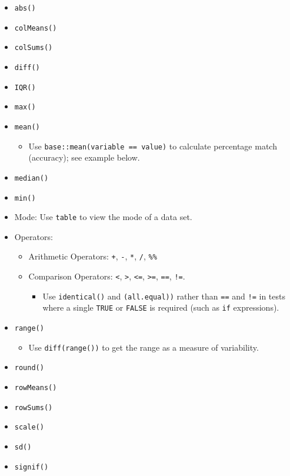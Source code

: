 \documentclass[
]{book}
\providecommand{\tightlist}{%
  \setlength{\itemsep}{0pt}\setlength{\parskip}{0pt}}
\begin{document}
\begin{itemize}
\tightlist
\item
  \texttt{abs()}
\item
  \texttt{colMeans()}
\item
  \texttt{colSums()}
\item
  \texttt{diff()}
\item
  \texttt{IQR()}
\item
  \texttt{max()}
\item
  \texttt{mean()}

  \begin{itemize}
  \tightlist
  \item
    Use \texttt{base::mean(variable\ ==\ value)} to calculate percentage match (accuracy); see example below.
  \end{itemize}
\item
  \texttt{median()}
\item
  \texttt{min()}
\item
  Mode: Use \texttt{table} to view the mode of a data set.
\item
  Operators:

  \begin{itemize}
  \tightlist
  \item
    Arithmetic Operators: \texttt{+}, \texttt{-}, \texttt{*}, \texttt{/}, \texttt{\%\%}
  \item
    Comparison Operators: \texttt{\textless{}}, \texttt{\textgreater{}}, \texttt{\textless{}=}, \texttt{\textgreater{}=}, \texttt{==}, \texttt{!=}.

    \begin{itemize}
    \tightlist
    \item
      Use \texttt{identical()} and \texttt{(all.equal))} rather than \texttt{==} and \texttt{!=} in tests where a single \texttt{TRUE} or \texttt{FALSE} is required (such as \texttt{if} expressions).
    \end{itemize}
  \end{itemize}
\item
  \texttt{range()}

  \begin{itemize}
  \tightlist
  \item
    Use \texttt{diff(range())} to get the range as a measure of variability.
  \end{itemize}
\item
  \texttt{round()}
\item
  \texttt{rowMeans()}
\item
  \texttt{rowSums()}
\item
  \texttt{scale()}
\item
  \texttt{sd()}
\item
  \texttt{signif()}


\end{itemize}
\end{document}
